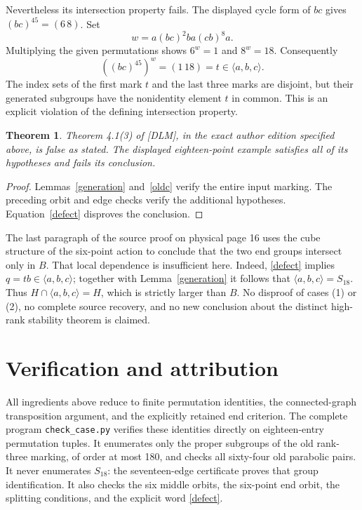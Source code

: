 \documentclass[a4paper,11pt]{article}
\newcommand{\gen}[1]{\langle#1\rangle}
\newtheorem{theorem}{Theorem}\newtheorem{lemma}[theorem]{Lemma}
\begin{document}
Nevertheless its intersection property fails. The displayed cycle form
of $bc$ gives $(bc)^{45}=(6\,8)$. Set
\[
 w=a(bc)^2ba(cb)^8a.
\]
Multiplying the given permutations shows $6^w=1$ and $8^w=18$.
Consequently
\begin{equation}\label{defect}
 ((bc)^{45})^w=(1\,18)=t\in\gen{a,b,c}.
\end{equation}
The index sets of the first mark $t$ and the last three marks are disjoint,
but their generated subgroups have the nonidentity element $t$ in common.
This is an explicit violation of the defining intersection property.

\begin{theorem}
Theorem 4.1(3) of [DLM], in the exact author edition specified above,
is false as stated. The displayed eighteen-point example satisfies all
of its hypotheses and fails its conclusion.
\end{theorem}
\begin{proof}
Lemmas~\ref{generation} and~\ref{oldc} verify the entire input marking.
The preceding orbit and edge checks verify the additional hypotheses.
Equation~\eqref{defect} disproves the conclusion.
\end{proof}

The last paragraph of the source proof on physical page 16 uses the cube
structure of the six-point action to conclude that the two end groups
intersect only in $B$. That local dependence is insufficient here.
Indeed, \eqref{defect} implies $q=tb\in\gen{a,b,c}$; together with
Lemma~\ref{generation} it follows that $\gen{a,b,c}=S_{18}$.
Thus $H\cap\gen{a,b,c}=H$, which is strictly larger than $B$.
No disproof of cases (1) or (2), no complete source recovery, and no
new conclusion about the distinct high-rank stability theorem is claimed.

\section{Verification and attribution}
All ingredients above reduce to finite permutation identities, the
connected-graph transposition argument, and the explicitly retained end
criterion. The complete program \texttt{check\_case.py} verifies these
identities directly on eighteen-entry permutation tuples. It enumerates
only the proper subgroups of the old rank-three marking, of order at most
180, and checks all sixty-four old parabolic pairs. It never enumerates
$S_{18}$: the seventeen-edge certificate proves that group identification.
It also checks the six middle orbits, the six-point end orbit, the splitting
conditions, and the explicit word \eqref{defect}.
\end{document}

